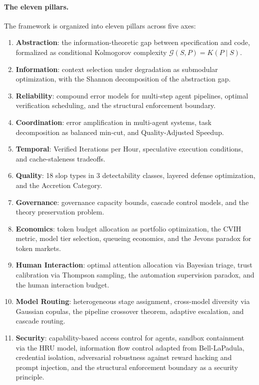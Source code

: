\documentclass[11pt, a4paper]{googledeepmind}
\begin{document}
\paragraph{The eleven pillars.} The framework is organized into eleven pillars across five axes:

\begin{enumerate}[label=(\roman*)]
    \item \textbf{Abstraction}: the information-theoretic gap between specification and code, formalized as conditional Kolmogorov complexity $\mathcal{G}(S,P) = K(P \mid S)$.
    \item \textbf{Information}: context selection under degradation as submodular optimization, with the Shannon decomposition of the abstraction gap.
    \item \textbf{Reliability}: compound error models for multi-step agent pipelines, optimal verification scheduling, and the structural enforcement boundary.
    \item \textbf{Coordination}: error amplification in multi-agent systems, task decomposition as balanced min-cut, and Quality-Adjusted Speedup.
    \item \textbf{Temporal}: Verified Iterations per Hour, speculative execution conditions, and cache-staleness tradeoffs.
    \item \textbf{Quality}: 18 slop types in 3 detectability classes, layered defense optimization, and the Accretion Category.
    \item \textbf{Governance}: governance capacity bounds, cascade control models, and the theory preservation problem.
    \item \textbf{Economics}: token budget allocation as portfolio optimization, the CVIH metric, model tier selection, queueing economics, and the Jevons paradox for token markets.
    \item \textbf{Human Interaction}: optimal attention allocation via Bayesian triage, trust calibration via Thompson sampling, the automation supervision paradox, and the human interaction budget.
    \item \textbf{Model Routing}: heterogeneous stage assignment, cross-model diversity via Gaussian copulas, the pipeline crossover theorem, adaptive escalation, and cascade routing.
    \item \textbf{Security}: capability-based access control for agents, sandbox containment via the HRU model, information flow control adapted from Bell-LaPadula, credential isolation, adversarial robustness against reward hacking and prompt injection, and the structural enforcement boundary as a security principle.
\end{enumerate}
\end{document}
